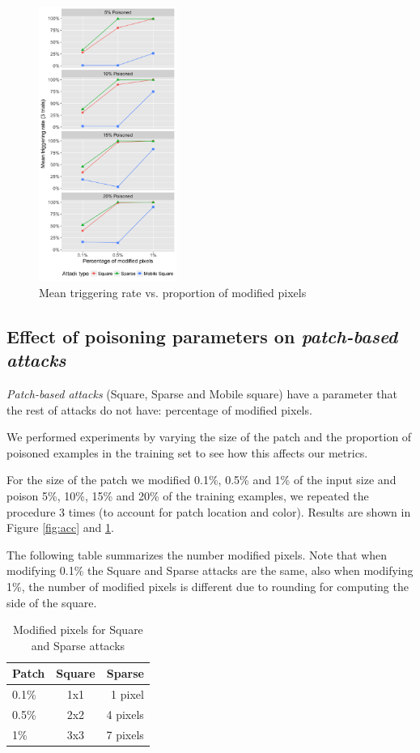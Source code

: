 \documentclass[letterpaper, 10 pt, conference]{ieeeconf}  %
\begin{document}
\begin{figure}[h]
\centering
\includegraphics[width=0.4\textwidth]{mean_rate.png}
\caption{Mean triggering rate vs. proportion of modified pixels}
\label{fig:rate}
\end{figure}


\subsection{Effect of poisoning parameters on \textit{patch-based attacks}}

\textit{Patch-based attacks} (Square, Sparse and Mobile square) have a
parameter that the rest of attacks do not have: percentage of modified pixels.

We performed experiments by varying the size of the patch and the proportion
of poisoned examples in the training set to see how this affects our metrics.

For the size of the patch we modified 0.1\%, 0.5\% and 1\% of the input size
and poison 5\%, 10\%, 15\% and 20\% of the training examples, we repeated
the procedure 3 times (to account for patch location and color). Results are
shown in Figure \ref{fig:acc} and \ref{fig:rate}.

The following table summarizes the number modified pixels. Note that when
modifying 0.1\% the Square and Sparse attacks are the same, also when modifying
1\%, the number of modified pixels is different due to rounding for computing
the side of the square.

\begin{table}
  \begin{center}
  \begin{tabular}{lcr}
    \hline
    Patch & Square & Sparse\\
    \hline
    0.1\% & 1x1 & 1 pixel \\
    0.5\% & 2x2 & 4 pixels\\
    1\% & 3x3 & 7 pixels \\
    \hline
  \end{tabular}
  \caption{Modified pixels for Square and Sparse attacks}
  \end{center}
\end{table}
\end{document}
